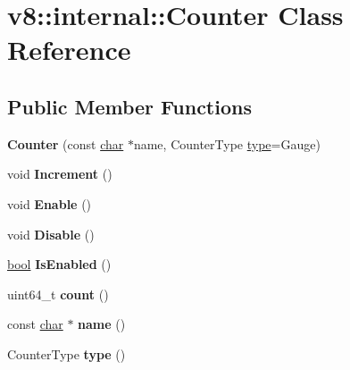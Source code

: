 \hypertarget{classv8_1_1internal_1_1Counter}{}\section{v8\+:\+:internal\+:\+:Counter Class Reference}
\label{classv8_1_1internal_1_1Counter}
\subsection*{Public Member Functions}
\begin{DoxyCompactItemize}
\item 
\mbox{\label{classv8_1_1internal_1_1Counter_ad889277c3fcb1a1de854d38a746b3678}} 
{\bfseries Counter} (const \mbox{\hyperlink{classchar}{char}} $\ast$name, Counter\+Type \mbox{\hyperlink{classstd_1_1conditional_1_1type}{type}}=Gauge)
\item 
\mbox{\label{classv8_1_1internal_1_1Counter_aebb2eca9123fe89e77921862546c5c08}} 
void {\bfseries Increment} ()
\item 
\mbox{\label{classv8_1_1internal_1_1Counter_ac98ddafa10780025c73c0e83bcd81c7d}} 
void {\bfseries Enable} ()
\item 
\mbox{\label{classv8_1_1internal_1_1Counter_add559c5e10d7fde48ef45630bf38927e}} 
void {\bfseries Disable} ()
\item 
\mbox{\label{classv8_1_1internal_1_1Counter_a7837cb1d47bfbf409da681478b152d2d}} 
\mbox{\hyperlink{classbool}{bool}} {\bfseries Is\+Enabled} ()
\item 
\mbox{\label{classv8_1_1internal_1_1Counter_af47eb19b2f7e287a0e3ffaef050cf512}} 
uint64\+\_\+t {\bfseries count} ()
\item 
\mbox{\label{classv8_1_1internal_1_1Counter_a45a8bf1f376f26fd81e774f9f0c4c208}} 
const \mbox{\hyperlink{classchar}{char}} $\ast$ {\bfseries name} ()
\item 
\mbox{\label{classv8_1_1internal_1_1Counter_a8f6d68c837d5a4ac787ed2fe51a58166}} 
Counter\+Type {\bfseries type} ()
\end{DoxyCompactItemize}


